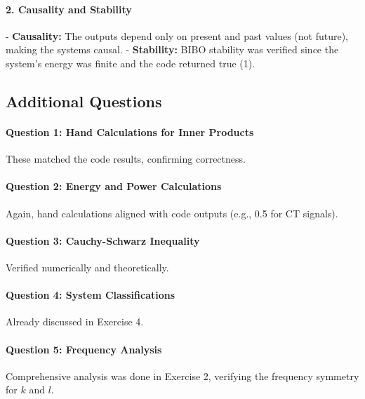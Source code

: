 \documentclass[10pt, twocolumn]{article}
\begin{document}
\paragraph{2. Causality and Stability}
- \textbf{Causality:} The outputs depend only on present and past values (not future), making the systems causal.
- \textbf{Stability:} BIBO stability was verified since the system’s energy was finite and the code returned true (1).

\subsection{Additional Questions}

\paragraph{Question 1: Hand Calculations for Inner Products}
These matched the code results, confirming correctness.

\paragraph{Question 2: Energy and Power Calculations}
Again, hand calculations aligned with code outputs (e.g., 0.5 for CT signals).

\paragraph{Question 3: Cauchy-Schwarz Inequality}
Verified numerically and theoretically.

\paragraph{Question 4: System Classifications}
Already discussed in Exercise 4.

\paragraph{Question 5: Frequency Analysis}
Comprehensive analysis was done in Exercise 2, verifying the frequency symmetry for \(k\) and \(l\).
\end{document}
